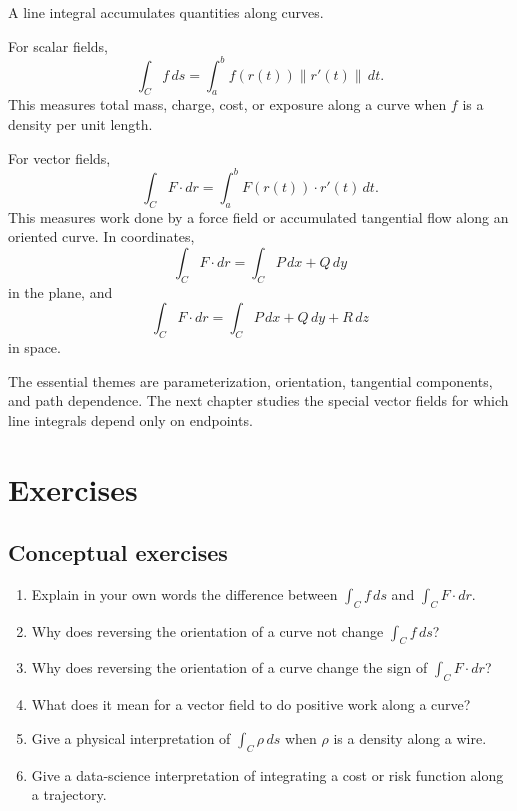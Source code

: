 \documentclass[11pt,oneside]{book}
\newcommand{\norm}[1]{\left\lVert #1\right\rVert}
\begin{document}
A line integral accumulates quantities along curves.

For scalar fields,
\[
\int_C f\,ds=\int_a^b f(r(t))\norm{r'(t)}\,dt.
\]
This measures total mass, charge, cost, or exposure along a curve when $f$ is a density per unit length.

For vector fields,
\[
\int_C F\cdot dr=\int_a^b F(r(t))\cdot r'(t)\,dt.
\]
This measures work done by a force field or accumulated tangential flow along an oriented curve. In coordinates,
\[
\int_C F\cdot dr=\int_C P\,dx+Q\,dy
\]
in the plane, and
\[
\int_C F\cdot dr=\int_C P\,dx+Q\,dy+R\,dz
\]
in space.

The essential themes are parameterization, orientation, tangential components, and path dependence. The next chapter studies the special vector fields for which line integrals depend only on endpoints.

\section{Exercises}

\subsection*{Conceptual exercises}
\begin{enumerate}
  \item Explain in your own words the difference between $\int_C f\,ds$ and $\int_C F\cdot dr$.
  \item Why does reversing the orientation of a curve not change $\int_C f\,ds$?
  \item Why does reversing the orientation of a curve change the sign of $\int_C F\cdot dr$?
  \item What does it mean for a vector field to do positive work along a curve?
  \item Give a physical interpretation of $\int_C \rho\,ds$ when $\rho$ is a density along a wire.
  \item Give a data-science interpretation of integrating a cost or risk function along a trajectory.
\end{enumerate}
\end{document}
